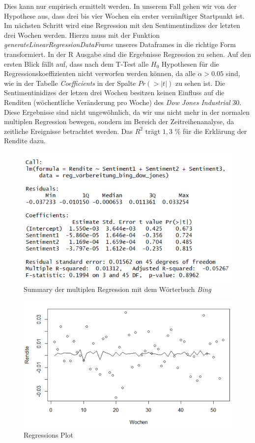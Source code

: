Dies kann nur empirisch ermittelt werden. In unserem Fall gehen wir von der Hypothese aus, dass drei bis vier Wochen ein erster vernünftiger Startpunkt ist. Im nächsten Schritt wird eine Regression mit den Sentimentindizes der letzten drei Wochen werden. Hierzu muss mit der Funktion \textit{generateLinearRegressionDataFrame} unseres Dataframes in die richtige Form transformiert. In der R Ausgabe sind die Ergebnisse Regression zu sehen. Auf den ersten Blick fällt auf, dass nach dem T-Test alle $H_{0}$ Hypothesen für die Regressionskoeffizienten nicht verworfen werden können, da alle $\alpha>0.05$ sind, wie in der Tabelle \textit{Coefficients} in der Spalte $Pr(>|t|)$ zu sehen ist. Die Sentimentinidizes der letzen drei Wochen besitzen keinen Einfluss auf die Renditen (wöchentliche Veränderung pro Woche)  des \textit{Dow Jones Industrial} $30$. Diese Ergebnisse sind nicht ungewöhnlich, da wir uns nicht mehr in der normalen multiplen Regression bewegen, sondern im Bereich der Zeitreihenanalyse, da zeitliche Ereignisse betrachtet werden. Das $R^2$ trägt $1,3$ \% für die Erklärung der Rendite dazu. 
 \begin{figure}[H]
   	\centering
  \includegraphics[width=1\textwidth]{Pictures/ergebnisse_sentiment.png}
   	\caption{Summary der multiplen Regression mit dem Wörterbuch \textit{Bing}}\label{Reg_bing}
\end{figure}
 \begin{figure}[H]
	\centering
	\includegraphics[width=1\textwidth]{Pictures/Regression_bing_diff.png}
	\caption{Regressions Plot}
\end{figure}
